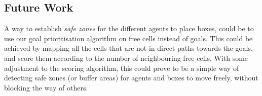 \subsection{Future Work}
\label{sec:future work}





A way to establish \textit{safe zones} for the different agents to place boxes, could be to use our goal prioritisation algorithm on free cells instead of goals.
This could be achieved by mapping all the cells that are not in direct paths towards the goals, and score them according to the number of neighbouring free cells.
With some adjustment to the scoring algorithm, this could prove to be a simple way of detecting safe zones (or buffer areas) for agents and boxes to move freely, without blocking the way of others.
